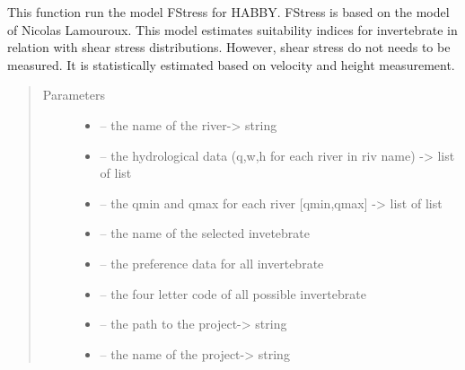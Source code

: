 \documentclass[letterpaper,10pt,english]{sphinxmanual}
\begin{document}

\begin{fulllineitems}
\label{\detokenize{index:src.fstress.run_fstress}}
This function run the model FStress for HABBY. FStress is based on the model of Nicolas Lamouroux. This model
estimates suitability indices for invertebrate in relation with shear stress distributions. However, shear stress
do not needs to be measured. It is statistically estimated based on velocity and height measurement.
\begin{quote}\begin{description}
\item[{Parameters}] \leavevmode\begin{itemize}
\item {} 
 -- the name of the river-\textgreater{} string

\item {} 
 -- the hydrological data (q,w,h for each river in riv name) -\textgreater{} list of list

\item {} 
 -- the qmin and qmax for each river {[}qmin,qmax{]} -\textgreater{} list of list

\item {} 
 -- the name of the selected invetebrate

\item {} 
 -- the preference data for all invertebrate

\item {} 
 -- the four letter code of all possible invertebrate

\item {} 
 -- the path to the project-\textgreater{} string

\item {} 
 -- the name of the project-\textgreater{} string

\end{itemize}

\end{description}\end{quote}

\end{fulllineitems}
\end{document}

